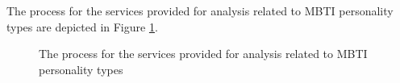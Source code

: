 The process for the services provided for analysis related to MBTI  personality types are depicted in Figure \ref{fig:mbti_process}.

\begin{figure}[htb]
\begin{center}
\end{center}
\caption{ The process for the services provided for analysis related to MBTI personality types \label{fig:mbti_process}}
\end{figure}
